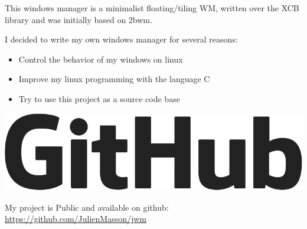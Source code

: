 \documentclass[letterpaper]{jm-cv} %
\begin{document}
\medskip
{}
\medskip

{\large{\color{maingray}\bullet}}

This windows manager is a minimalist floating/tiling WM, written over the XCB library and was initially based on 2bwm.

\begin{minipage}{.7\textwidth}
  I decided to write my own windows manager for several reasons:
  \begin{itemize}
  \item[\color{mainblue}\faArrowRight] Control the behavior of my windows on linux
  \item[\color{mainblue}\faArrowRight] Improve my linux programming with the language C
  \item[\color{mainblue}\faArrowRight] Try to use this project as a source code base
  \end{itemize}
\end{minipage}%
\begin{minipage}{.3\textwidth}
  \center
  \includegraphics[scale=0.10]{logo-github.png}
\end{minipage}
\vspace{0.2cm}

My project is Public and available on github:\\
\href{https://github.com/JulienMasson/jwm}{https://github.com/JulienMasson/jwm}
\end{document}
